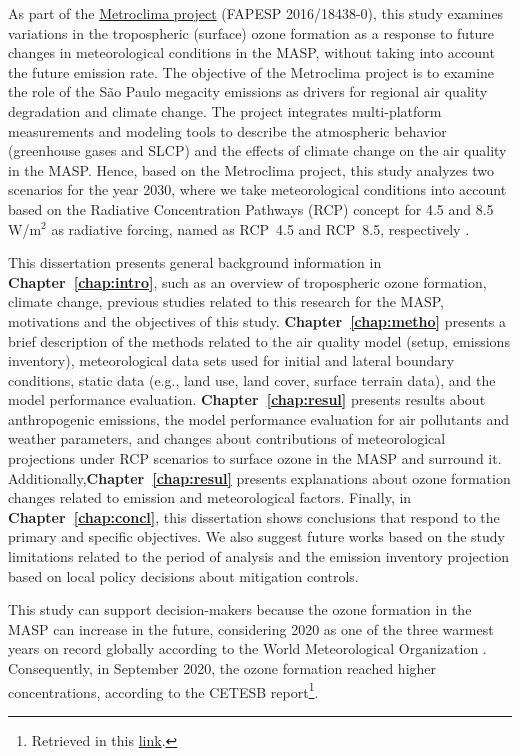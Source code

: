 As part of the \href{http://www.metroclima.iag.usp.br/}{Metroclima project} (FAPESP 2016/18438-0), this study examines variations in the tropospheric (surface) ozone formation as a response to future changes in meteorological conditions in the MASP, without taking into account the future emission rate. 
The objective of the Metroclima project is to examine the role of the S\~{a}o Paulo megacity emissions as drivers for regional air quality degradation and climate change.
The project integrates multi-platform measurements and modeling tools to describe the atmospheric behavior (greenhouse gases and SLCP) and the effects of climate change on the air quality in the MASP.
Hence, based on the Metroclima project, this study analyzes two scenarios for the year 2030, where we take meteorological conditions into account based on the Radiative Concentration Pathways (RCP) concept for 4.5 and 8.5 W/m$^2$ as radiative forcing, named as RCP~4.5 and RCP~8.5, respectively \citep{VanVuuren2011a}.

This dissertation presents general background information in \textbf{Chapter~\ref{chap:intro}}, such as an overview of tropospheric ozone formation, climate change, previous studies related to this research for the MASP, motivations and the objectives of this study.
\textbf{Chapter~\ref{chap:metho}} presents a brief description of the methods related to the air quality model (setup, emissions inventory), meteorological data sets used for initial and lateral boundary conditions, static data (e.g., land use, land cover, surface terrain data), and the model performance evaluation.
\textbf{Chapter~\ref{chap:resul}} presents results about anthropogenic emissions, the model performance evaluation for air pollutants and weather parameters, and changes about contributions of meteorological projections under RCP scenarios to surface ozone in the MASP and surround it. 
Additionally,\textbf{Chapter~\ref{chap:resul}} presents explanations about ozone formation changes related to emission and meteorological factors.
Finally, in \textbf{Chapter~\ref{chap:concl}}, this dissertation shows conclusions that respond to the primary and specific objectives.
We also suggest future works based on the study limitations related to the period of analysis and the emission inventory projection based on local policy decisions about mitigation controls.

This study can support decision-makers because the ozone formation in the MASP can increase in the future, considering 2020 as one of the three warmest years on record globally according to the World Meteorological Organization \citep{WMO2020}. Consequently, in September 2020, the ozone formation reached higher concentrations, according to the CETESB report\footnote{Retrieved in this \href{https://cetesb.sp.gov.br/ar/wp-content/uploads/sites/28/2020/11/Boletim-Mensal-da-Qualidade-do-Ar-Setembro-2020.pdf}{link}.}.


